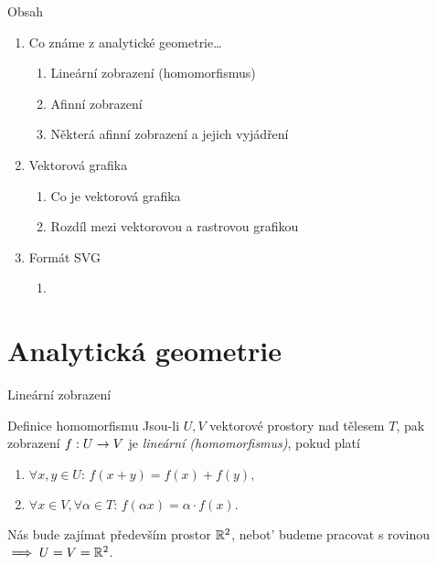 \documentclass[11pt,aspectratio=169]{beamer}
\begin{document}
    \maketitle

    \begin{frame}[t]{Obsah}
        \begin{enumerate}
            \item Co známe z analytické geometrie\dots
            \begin{enumerate}
                \item Lineární zobrazení (homomorfismus)
                \item Afinní zobrazení
                \item Některá afinní zobrazení a jejich vyjádření
            \end{enumerate}
            \item Vektorová grafika
            \begin{enumerate}
                \item Co je vektorová grafika
                \item Rozdíl mezi vektorovou a rastrovou grafikou
            \end{enumerate}
            \item Formát SVG
            \begin{enumerate}
                \item {}
            \end{enumerate}
        \end{enumerate}
    \end{frame}

    \section{Analytická geometrie}

    \begin{frame}[t]{Lineární zobrazení}
        \begin{block}{Definice homomorfismu}
            Jsou-li $U,V$ vektorové prostory nad tělesem $T$, pak zobrazení $f:U \rightarrow V$ je \emph{lineární (homomorfismus)}, pokud platí
            \begin{enumerate}[I]
                \item \(\forall x,y\in U:\,f(x+y)=f(x)+f(y),\)
                \item \(\forall x\in V,\forall \alpha\in T:\,f(\alpha x)=\alpha\cdot f(x).\)
            \end{enumerate}
        \end{block}
        Nás bude zajímat především prostor $\mathbb{R}^2$, nebot' budeme pracovat s rovinou $\implies U=V=\mathbb{R}^2$.
    \end{frame}
\end{document}
